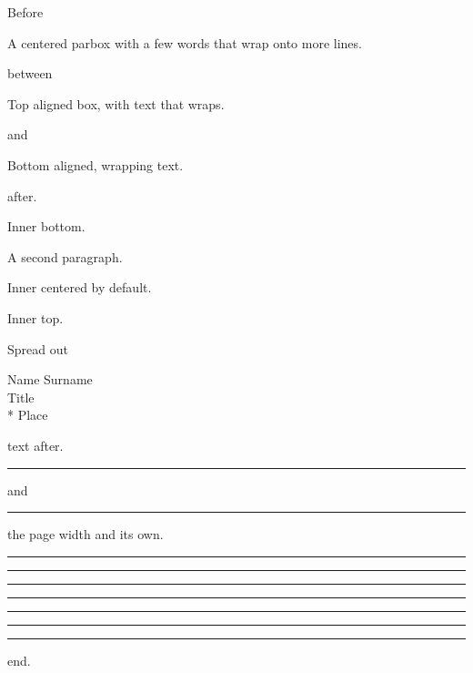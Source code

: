 \documentclass{article}
\begin{document}
Before \parbox{3cm}{A centered parbox with a few words that wrap onto more lines.} between
\parbox[t]{2.5cm}{Top aligned box, with text that wraps.} and \parbox[b]{2cm}{Bottom aligned, wrapping text.} after.

\noindent\parbox[t][3cm][b]{4cm}{Inner bottom.\par A second paragraph.}\hfill
\parbox[c][2cm]{3cm}{Inner centered by default.}\hfill\parbox[b][2cm][t]{3cm}{Inner top.}\hfill
\parbox[t][1cm][s]{2cm}{Spread out}


\parbox{.5\textwidth}{\raggedleft Name Surname\\ Title\\* Place\\} text after.
\parbox{.5\textwidth}{\rule{.2\textwidth}{1pt} and \rule{.2\linewidth}{1pt}} the page width and its own.

\noindent\rule{\dimexpr 2cm*3/4\relax}{1pt} \rule{\dimexpr(1cm+1pt)/3}{1pt} \rule{\dimexpr\linewidth/7}{1pt}
\rule{\dimexpr 3sp*1/2\relax}{1pt} \rule{\dimexpr 5sp/2}{1pt} \rule[\dimexpr -5sp/2\relax]{\dimexpr 7sp*3\relax}{1pt}
\rule{\dimexpr\fboxsep+\fboxrule}{2pt} end.
\end{document}
